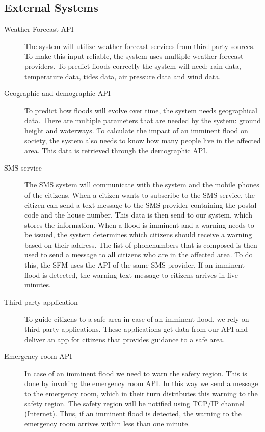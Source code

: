 \subsection{External Systems}
\label{subsec:external-system}
\begin{description}
	\item[Weather Forecast API] The system will utilize weather forecast services from third party sources. To make this input reliable, the system uses multiple weather forecast providers. To predict floods correctly the system will need: rain data, temperature data, tides data, air pressure data and wind data.
	\item[Geographic and demographic API] To predict how floods will evolve over time, the system needs geographical data. There are multiple parameters that are needed by the system: ground height and waterways. To calculate the impact of an imminent flood on society, the system also needs to know how many people live in the affected area. This data is retrieved through the demographic API.
	\item[SMS service] The SMS system will communicate with the system and the mobile phones of the citizens. When a citizen wants to subscribe to the SMS service, the citizen can send a text message to the SMS provider containing the postal code and the house number. This data is then send to our system, which stores the information. When a flood is imminent and a warning needs to be issued, the system determines which citizens should receive a warning based on their address. The list of phonenumbers that is composed is then used to send a message to all citizens who are in the affected area. To do this, the SFM uses the API of the same SMS provider. If an imminent flood is detected, the warning text message to citizens arrives in five minutes.
	\item[Third party application] To guide citizens to a safe area in case of an imminent flood, we rely on third party applications. These applications get data from our API and deliver an app for citizens that provides guidance to a safe area.
	\item[Emergency room API] In case of an imminent flood we need to warn the safety region. This is done by invoking the emergency room API. In this way we send a message to the emergency room, which in their turn distributes this warning to the safety region. The safety region will be notified using TCP/IP channel (Internet). Thus, if an imminent flood is detected, the warning to the emergency room arrives within less than one minute.
\end{description}

